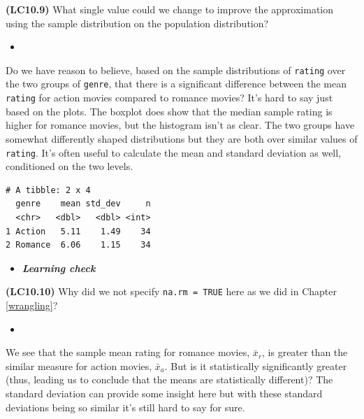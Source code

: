 \documentclass[12pt,]{krantz}
\makeatletter
\newenvironment{Shaded}{\begin{snugshade}}{\end{snugshade}}
\newcommand{\KeywordTok}[1]{\textcolor[rgb]{0.27,0.27,0.27}{\textbf{#1}}}
\newcommand{\DataTypeTok}[1]{\textcolor[rgb]{0.27,0.27,0.27}{#1}}
\newcommand{\StringTok}[1]{\textcolor[rgb]{0.5,0.5,0.5}{#1}}
\newcommand{\OperatorTok}[1]{\textcolor[rgb]{0.43,0.43,0.43}{\textbf{#1}}}
\newcommand{\NormalTok}[1]{#1}
\newenvironment{kframe}{%
\medskip{}
\setlength{\fboxsep}{.8em}
 \def\at@end@of@kframe{}%
 \ifinner\ifhmode%
  \def\at@end@of@kframe{\end{minipage}}%
  \begin{minipage}{\columnwidth}%
 \fi\fi%
 \def\FrameCommand##1{\hskip\@totalleftmargin \hskip-\fboxsep
 \colorbox{shadecolor}{##1}\hskip-\fboxsep
     \hskip-\linewidth \hskip-\@totalleftmargin \hskip\columnwidth}%
 \MakeFramed {\advance\hsize-\width
   \@totalleftmargin\z@ \linewidth\hsize
   \@setminipage}}%
 {\par\unskip\endMakeFramed%
 \at@end@of@kframe}
\renewenvironment{Shaded}{\begin{kframe}}{\end{kframe}}
\newenvironment{rmdblock}[1]
  {\begin{shaded*}
  \begin{itemize}
  \renewcommand{\labelitemi}{
    \raisebox{-.7\height}[0pt][0pt]{
    }
  }
  \item
  }
  {
  \end{itemize}
  \end{shaded*}
  }
\newenvironment{learncheck}
  {\begin{rmdblock}{warning}}
  {\end{rmdblock}}
\theoremstyle{definition}
\theoremstyle{definition}
\theoremstyle{definition}
\theoremstyle{remark}
\makeatother
\begin{document}
\textbf{(LC10.9)} What single value could we change to improve the
approximation using the sample distribution on the population
distribution?

\begin{learncheck}

\end{learncheck}

Do we have reason to believe, based on the sample distributions of
\texttt{rating} over the two groups of \texttt{genre}, that there is a
significant difference between the mean \texttt{rating} for action
movies compared to romance movies? It's hard to say just based on the
plots. The boxplot does show that the median sample rating is higher for
romance movies, but the histogram isn't as clear. The two groups have
somewhat differently shaped distributions but they are both over similar
values of \texttt{rating}. It's often useful to calculate the mean and
standard deviation as well, conditioned on the two levels.

\begin{Shaded}
\end{Shaded}

\begin{verbatim}
# A tibble: 2 x 4
  genre    mean std_dev     n
  <chr>   <dbl>   <dbl> <int>
1 Action   5.11    1.49    34
2 Romance  6.06    1.15    34
\end{verbatim}

\begin{learncheck}
\textbf{\emph{Learning check}}
\end{learncheck}

\textbf{(LC10.10)} Why did we not specify \texttt{na.rm\ =\ TRUE} here
as we did in Chapter \ref{wrangling}?

\begin{learncheck}

\end{learncheck}

We see that the sample mean rating for romance movies, \(\bar{x}_{r}\),
is greater than the similar measure for action movies, \(\bar{x}_a\).
But is it statistically significantly greater (thus, leading us to
conclude that the means are statistically different)? The standard
deviation can provide some insight here but with these standard
deviations being so similar it's still hard to say for sure.
\end{document}
